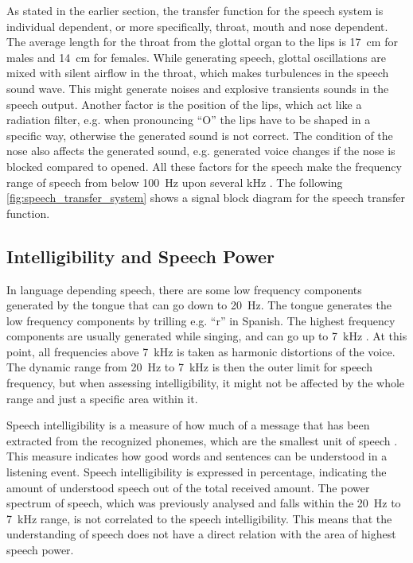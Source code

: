 As stated in the earlier section, the transfer function for the speech system is individual dependent, or more specifically, throat, mouth and nose dependent. The average length for the throat from the glottal organ to the lips is \SI{17}{\centi\meter} for males and \SI{14}{\centi\meter} for females. While generating speech, glottal oscillations are mixed with silent airflow in the throat, which makes turbulences in the speech sound wave. This might generate noises and explosive transients sounds in the speech output. Another factor is the position of the lips, which act like a radiation filter, e.g. when pronouncing \enquote{O} the lips have to be shaped in a specific way, otherwise the generated sound is not correct. The condition of the nose also affects the generated sound, e.g.  generated voice changes if the nose is blocked compared to opened. All these factors for the speech make the frequency range of speech from below \SI{100}{\hertz}  upon several \si{\kilo\hertz} \citep{pulkki2015}. The following \autoref{fig:speech_transfer_system} shows a signal block diagram for the speech transfer function.


\subsection{Intelligibility and Speech Power}
\label{sec:intel}

In language depending speech, there are some low frequency components generated by the tongue that can go down to \SI{20}{\hertz}. The tongue generates the low frequency components by trilling e.g. \enquote{r} in Spanish. The highest frequency components are usually generated while singing, and can go up to \SI{7}{\kilo\hertz} \citep{pulkki2015}. At this point, all frequencies above \SI{7}{\kilo\hertz} is taken as harmonic distortions of the voice. The dynamic range from \SI{20}{\hertz} to \SI{7}{\kilo\hertz} is then the outer limit for speech frequency, but when assessing intelligibility, it might not be affected by the whole range and just a specific area within it.

Speech intelligibility is a measure of how much of a message that has been extracted from the recognized phonemes, which are the smallest unit of speech \citep{arl_us_army}. This measure indicates how good words and sentences can be understood in a listening event. Speech intelligibility  is expressed in percentage, indicating the amount of understood speech out of the total received amount. The power spectrum of speech, which was previously analysed and falls within the \SI{20}{\hertz} to \SI{7}{\kilo\hertz} range, is not correlated to the speech intelligibility. This means that the understanding of speech does not have a direct relation with the area of highest speech power. 

